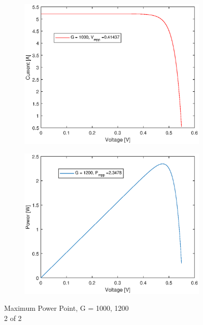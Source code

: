 \begin{figure}[H]
\begin{center}
\begin{subfigure}{0.4\textwidth}
\begin{center}
				\end{center}	
			\end{subfigure}
			\begin{subfigure}{0.4\textwidth}
				\begin{center}
					\includegraphics[width=1\textwidth]{figures/vg1200.eps}
				\end{center}	
			\end{subfigure}
			\begin{subfigure}{0.4\textwidth}
				\begin{center}
					\includegraphics[width=1\textwidth]{figures/pg1200.eps}
				\end{center}	
			\end{subfigure}
			\caption{Maximum Power Point, G = 1000, 1200\\ 2 of 2}
			\label{fig:max2}
		\end{center}
		\end{figure}
	
